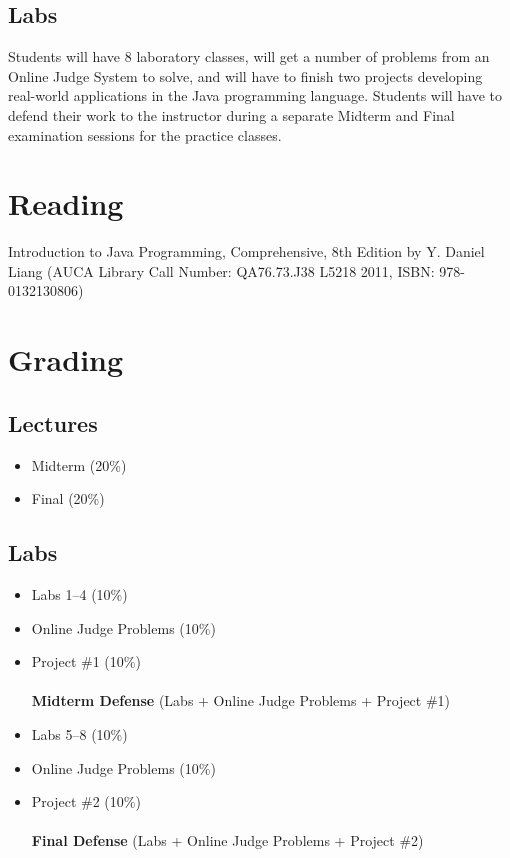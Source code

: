 \documentclass[12pt,a4paper,oneside]{article}
\begin{document}
        \subsection{Labs}

            Students will have 8 laboratory classes, will get a number of
            problems from an Online Judge System to solve, and will have to
            finish two projects developing real-world applications in the Java
            programming language. Students will have to defend their work to the
            instructor during a separate Midterm and Final examination sessions
            for the practice classes.

    \section{Reading}

        Introduction to Java Programming, Comprehensive, 8th Edition by Y.
        Daniel Liang (AUCA Library Call Number: QA76.73.J38 L5218 2011, ISBN:
        978-0132130806)

    \section{Grading}

        \subsection{Lectures}

            \begin{itemize}
                \item Midterm (20\%)
                \item Final (20\%)
            \end{itemize}

        \subsection{Labs}

            \begin{itemize}
                \item Labs 1--4 (10\%)
                \item Online Judge Problems (10\%)
                \item Project \#1 (10\%)\\\\
                    \textbf{Midterm Defense} (Labs + Online Judge Problems +
                    Project \#1)\\
                \item Labs 5--8 (10\%)
                \item Online Judge Problems (10\%)
                \item Project \#2 (10\%)\\\\
                    \textbf{Final Defense} (Labs + Online Judge Problems +
                    Project \#2)\\
            \end{itemize}
\end{document}
